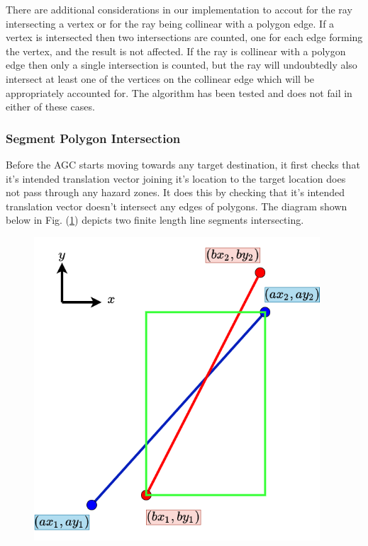 \documentclass[11pt,landscape]{article}
\begin{document}
\begin{multicols}{3}
There are additional considerations in our implementation to accout for the ray
intersecting a vertex or for the ray being collinear with a polygon edge. If a
vertex is intersected then two intersections are counted, one for each edge
forming the vertex, and the result is not affected. If the ray is collinear
with a polygon edge then only a single intersection is counted, but the ray will
undoubtedly also intersect at least one of the vertices on the collinear edge
which will be appropriately accounted for.
The algorithm has been tested and does not fail in either of these cases.

\subsubsection{Segment Polygon Intersection}
Before the AGC starts moving towards any target destination, it first checks
that it's intended translation vector joining it's location to the target
location does not pass through
any hazard zones. It does this by checking that it's intended translation vector
doesn't intersect any edges of polygons. The diagram shown below in Fig.
(\ref{fig:segment_intersection}) depicts two finite length line segments
intersecting.
\begin{figure}[H]
    \begin{mdframed}
        \begin{center}
            \includegraphics[width=0.95\textwidth]{segment_intersection.png}
        \end{center}
    \end{mdframed}
    \label{fig:segment_intersection}
\end{figure}
 

\end{multicols}
\end{document}
